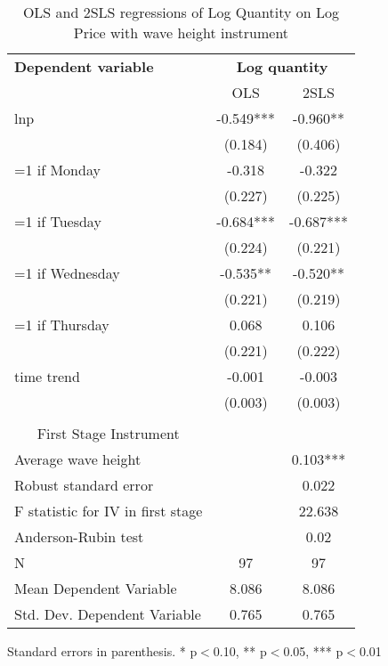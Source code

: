 \begin{table}[htbp]\centering
\scriptsize
\caption{OLS and 2SLS regressions of Log Quantity on Log Price with wave height instrument}
\label{2sls_2}
\begin{center}
\begin{threeparttable}
\begin{tabular}{l*{2}{c}}
\toprule
\multicolumn{1}{l}{\textbf{Dependent variable}}&
\multicolumn{2}{c}{\textbf{Log quantity}}\\
\multicolumn{1}{c}{}&
\multicolumn{1}{c}{OLS}&
\multicolumn{1}{c}{2SLS}\\
\midrule
lnp                 &      -0.549***&      -0.960** \\
                    &     (0.184)   &     (0.406)   \\
=1 if Monday        &      -0.318   &      -0.322   \\
                    &     (0.227)   &     (0.225)   \\
=1 if Tuesday       &      -0.684***&      -0.687***\\
                    &     (0.224)   &     (0.221)   \\
=1 if Wednesday     &      -0.535** &      -0.520** \\
                    &     (0.221)   &     (0.219)   \\
=1 if Thursday      &       0.068   &       0.106   \\
                    &     (0.221)   &     (0.222)   \\
time trend          &      -0.001   &      -0.003   \\
                    &     (0.003)   &     (0.003)   \\
\\
\midrule
\multicolumn{1}{c}{First Stage Instrument}\\
Average wave height &               &       0.103***\\
Robust standard error &               &       0.022   \\
F statistic for IV in first stage&               &      22.638   \\
Anderson-Rubin test &               &        0.02   \\
N                   &          97   &          97   \\
Mean Dependent Variable&       8.086   &       8.086   \\
Std. Dev. Dependent Variable&       0.765   &       0.765   \\
\bottomrule
\end{tabular}
\begin{tablenotes}
\tiny
\item Standard errors in parenthesis. * p$<$0.10, ** p$<$0.05, *** p$<$0.01
\end{tablenotes}
\end{threeparttable}
\end{center}
\end{table}
